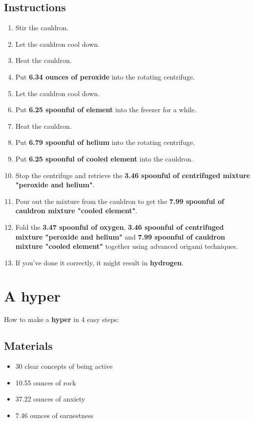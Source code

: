 \documentclass{article}
\begin{document}
\subsection{Instructions}\begin{enumerate}
\item 
Stir the cauldron.
\item 
Let the cauldron cool down.
\item 
Heat the cauldron.
\item 
Put \textbf{6.34 ounces of peroxide} into the rotating centrifuge.
\item 
Let the cauldron cool down.
\item 
Put \textbf{6.25 spoonful of element} into the freezer for a while.
\item 
Heat the cauldron.
\item 
Put \textbf{6.79 spoonful of helium} into the rotating centrifuge.
\item 
Put \textbf{6.25 spoonful of cooled element} into the cauldron.
\item 
Stop the centrifuge and retrieve the \textbf{3.46 spoonful of centrifuged mixture "peroxide and helium"}.
\item 
Pour out the mixture from the cauldron to get the \textbf{7.99 spoonful of cauldron mixture "cooled element"}.
\item 
Fold the \textbf{3.47 spoonful of oxygen}, \textbf{3.46 spoonful of centrifuged mixture "peroxide and helium"} and \textbf{7.99 spoonful of cauldron mixture "cooled element"} together using advanced origami techniques.
\item 
If you've done it correctly, it might result in \textbf{hydrogen}.
\end{enumerate}
\newpage
\section{A hyper}How to make a \textbf{hyper} in 4 easy steps:

\subsection{Materials}\begin{itemize}
\item 
30 clear concepts of being active
\item 
10.55 ounces of rock
\item 
37.22 ounces of anxiety
\item 
7.46 ounces of earnestness
\end{itemize}
\end{document}
